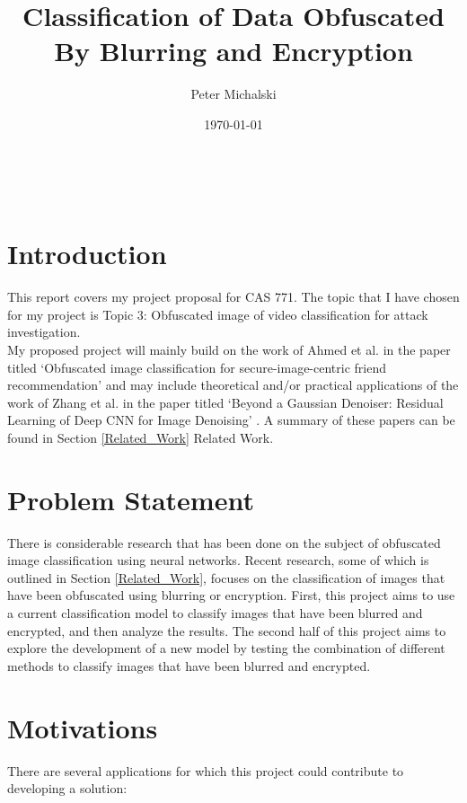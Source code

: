 \documentclass[12pt, titlepage]{article}
\begin{document}
\title{Classification of Data Obfuscated By Blurring and Encryption} 
\author{Peter Michalski}
\date{\today}

\maketitle

\newpage

\tableofcontents
{}

~\newpage
{}


\section{Introduction}

This report covers my project proposal for CAS 771. The topic that I have chosen for my project is Topic 3: Obfuscated image of video classification for attack investigation.\\

\noindent My proposed project will mainly build on the work of Ahmed et al. in the paper titled `Obfuscated image classification for secure-image-centric friend recommendation' \citep{ahmed2018obfuscated} and may include theoretical and/or practical applications of the work of Zhang et al. in the paper titled `Beyond a Gaussian Denoiser: Residual Learning of Deep CNN for Image Denoising' \citep{zhang2017beyond}. A summary of these papers can be found in Section \ref{Related_Work} Related Work.\\

\section{Problem Statement}\label{ps}
There is considerable research that has been done on the subject of obfuscated image classification using neural networks. Recent research, some of which is outlined in Section \ref{Related_Work}, focuses on the classification of images that have been obfuscated using blurring or encryption. First, this project aims to use a current classification model to classify images that have been blurred and encrypted, and then analyze the results. The second half of this project aims to explore the development of a new model by testing the combination of different methods to classify images that have been blurred and encrypted.

\section{Motivations}\label{motivations}
There are several applications for which this project could contribute to developing a solution:
\end{document}
